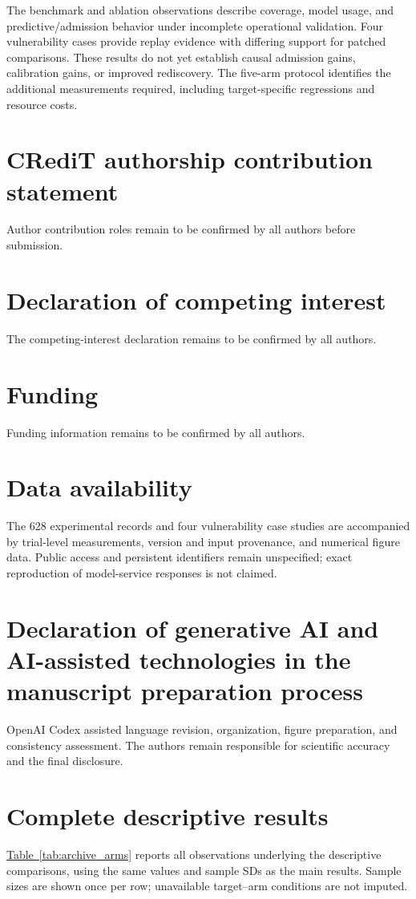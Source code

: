 \documentclass[final,5p,times,number]{elsarticle}
\newcommand{\namedref}[2]{\hyperref[#2]{#1~\ref*{#2}}}
\begin{document}
The benchmark and ablation observations describe coverage, model usage, and predictive/admission behavior under incomplete operational validation. Four vulnerability cases provide replay evidence with differing support for patched comparisons. These results do not yet establish causal admission gains, calibration gains, or improved rediscovery. The five-arm protocol identifies the additional measurements required, including target-specific regressions and resource costs.

\section*{CRediT authorship contribution statement}
Author contribution roles remain to be confirmed by all authors before submission.
\section*{Declaration of competing interest}
The competing-interest declaration remains to be confirmed by all authors.
\section*{Funding}
Funding information remains to be confirmed by all authors.
\section*{Data availability}
The 628 experimental records and four vulnerability case studies are accompanied by trial-level measurements, version and input provenance, and numerical figure data. Public access and persistent identifiers remain unspecified; exact reproduction of model-service responses is not claimed.
\section*{Declaration of generative AI and AI-assisted technologies in the manuscript preparation process}
OpenAI Codex assisted language revision, organization, figure preparation, and consistency assessment. The authors remain responsible for scientific accuracy and the final disclosure.

\appendix
\setcounter{table}{0}
\renewcommand{\theHtable}{appendix.\Alph{section}.\arabic{table}}
\section{Complete descriptive results}
\label{sec:archive_appendix}
\namedref{Table}{tab:archive_arms} reports all observations underlying the descriptive comparisons, using the same values and sample SDs as the main results. Sample sizes are shown once per row; unavailable target--arm conditions are not imputed.




\end{document}
